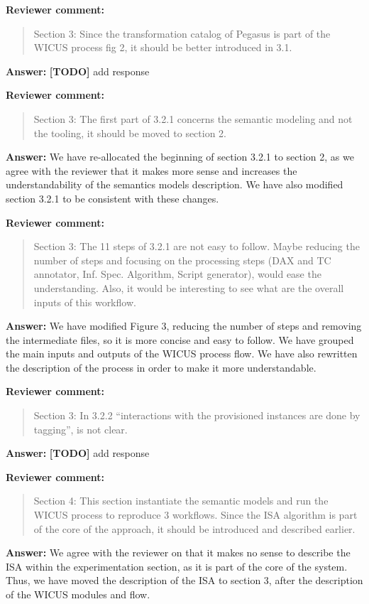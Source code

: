 \documentclass{letter}
\newenvironment{review}%
{\textbf{Reviewer comment:}\begin{quote}}%
{\end{quote}}%
\newcommand{\todo}[1]{%
      \color{red}\textbf{[TODO]} #1\color{black}}
\newcommand{\answer}[1]{%
      \textbf{Answer:} #1}
\begin{document}
\begin{letter}{}
\begin{review}
Section 3: Since the transformation catalog of Pegasus is part of the WICUS process fig 2, it should be better introduced in 3.1.
\end{review}

\answer{\todo{add response}}


\begin{review}
Section 3: The first part of 3.2.1 concerns the semantic modeling and not the tooling, it should be moved to section 2.
\end{review}

\answer{We have re-allocated the beginning of section 3.2.1 to section 2, as we agree with the reviewer that it makes  more sense and increases the understandability of the semantics models description. We have also modified section 3.2.1 to be consistent with these changes.}


\begin{review}
Section 3: The 11 steps of 3.2.1 are not easy to follow. Maybe reducing the number of steps and focusing on the processing steps (DAX and TC annotator, Inf. Spec. Algorithm, Script generator), would ease the understanding. Also, it would be interesting to see what are the overall inputs of this workflow.
\end{review}

\answer{We have modified Figure 3, reducing the number of steps and removing the intermediate files, so it is more concise and easy to follow. We have grouped the main inputs and outputs of the WICUS process flow. We have also rewritten the description of the process in order to make it more understandable.}


\begin{review}
Section 3: In 3.2.2 ``interactions with the provisioned instances are done by tagging'', is not clear.
\end{review}

\answer{\todo{add response}}


\begin{review}
Section 4: This section instantiate the semantic models and run the WICUS process to reproduce 3 workflows. Since the ISA algorithm is part of the core of the approach, it should be introduced and described earlier.
\end{review}

\answer{We agree with the reviewer on that it makes no sense to describe the ISA within the experimentation section, as it is part of the core of the system. Thus, we have moved the description of the ISA to section 3, after the description of the WICUS modules and flow.}



\end{letter}
\end{document}
